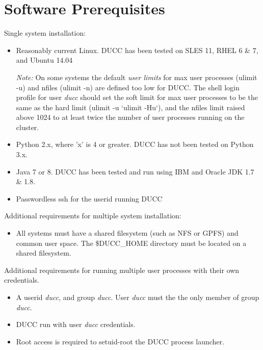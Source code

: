 \section{Software Prerequisites}
\label{sec:install.prerequisites}

Single system installation:

\begin{itemize}
  \item Reasonably current Linux.  DUCC has been tested on SLES 11, RHEL 6 \& 7, and Ubuntu 14.04 
    
    {\em Note:} On some systems the default {\em user limits}
    for max user processes (ulimit -u) and nfiles (ulimit -n) are defined too
    low for DUCC. The shell login profile for user {\em ducc} should set the
    soft limit for max user processes to be the same as the hard limit
    (ulimit -u `ulimit -Hu`), and
    the nfiles limit raised above 1024 to at least twice the number of user
    processes running on the cluster.

  \item Python 2.x, where 'x' is 4 or greater.  DUCC has not been tested on Python 3.x.
  \item Java 7 or 8. DUCC has been tested and run using IBM and Oracle JDK 1.7 \& 1.8.
  \item Passwordless ssh for the userid running DUCC
\end{itemize}
  
Additional requirements for multiple system installation:

\begin{itemize}
  \item All systems must have a shared filesystem (such as NFS or GPFS) and common user space.
        The \$DUCC\_HOME directory must be located on a shared filesystem.
\end{itemize}
  
Additional requirements for running multiple user processes with their own credentials.

\begin{itemize}
  \item A userid {\em ducc}, and group {\em ducc}.  User {\em ducc} must the the only member of group {\em ducc}.
  \item DUCC run with user {\em ducc} credentials.
  \item Root access is required to setuid-root the DUCC process launcher.
\end{itemize}
  
